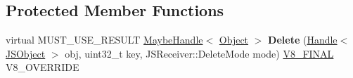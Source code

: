 \subsection*{Protected Member Functions}
\begin{DoxyCompactItemize}
\item 
\hypertarget{classv8_1_1internal_1_1_dictionary_elements_accessor_a32ea3cfee2d352fe45070254311fb2e2}{}virtual M\+U\+S\+T\+\_\+\+U\+S\+E\+\_\+\+R\+E\+S\+U\+L\+T \hyperlink{classv8_1_1internal_1_1_maybe_handle}{Maybe\+Handle}$<$ \hyperlink{classv8_1_1internal_1_1_object}{Object} $>$ {\bfseries Delete} (\hyperlink{classv8_1_1internal_1_1_handle}{Handle}$<$ \hyperlink{classv8_1_1internal_1_1_j_s_object}{J\+S\+Object} $>$ obj, uint32\+\_\+t key, J\+S\+Receiver\+::\+Delete\+Mode mode) \hyperlink{classv8_1_1internal_1_1_v8___f_i_n_a_l}{V8\+\_\+\+F\+I\+N\+A\+L} V8\+\_\+\+O\+V\+E\+R\+R\+I\+D\+E\label{classv8_1_1internal_1_1_dictionary_elements_accessor_a32ea3cfee2d352fe45070254311fb2e2}

\end{DoxyCompactItemize}
